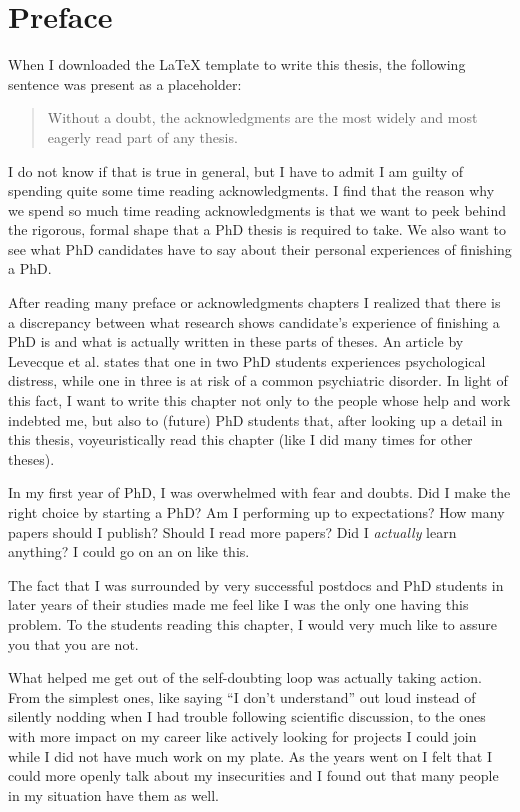 \chapter*{Preface}

When I downloaded the \LaTeX{} template to write this thesis, the following
sentence was present as a placeholder:
\begin{quote}
    Without a doubt, the acknowledgments are the most widely and most eagerly
    read part of any thesis.
\end{quote}
\noindent
I do not know if that is true in general, but I have to admit I am guilty of
spending quite some time reading acknowledgments. I find that the reason why we
spend so much time reading acknowledgments is that we want to peek behind the
rigorous, formal shape that a PhD thesis is required to take. We also want to
see what PhD candidates have to say about their personal experiences of
finishing a PhD.

After reading many preface or acknowledgments chapters I realized that there
is a discrepancy between what research shows candidate's experience of finishing
a PhD is and what is actually written in these parts of theses. An
article by Levecque et al. \cite{labhg-17-phdstudents} states that one in two
PhD students experiences psychological distress, while one in three is at risk
of a common psychiatric disorder. In light of this fact, I want to write
this chapter not only to the people whose help and work indebted me, but also to
(future) PhD students that, after looking up a detail in this thesis,
voyeuristically read this chapter (like I did many times for other theses).

In my first year of PhD, I was overwhelmed with fear and doubts. Did I make the
right choice by starting a PhD? Am I performing up to expectations? How many
papers should I publish? Should I read more papers? Did I \emph{actually} learn
anything? I could go on an on like this.

The fact that I was surrounded by very successful postdocs and PhD students in
later years of their studies made me feel like I was the only one having this
problem. To the students reading this chapter, I would very much like to assure
you that you are not. 

What helped me get out of the self-doubting loop was actually taking action. From
the simplest ones, like saying ``I don't understand'' out loud instead of
silently nodding when I had trouble following scientific discussion, to the
ones with more impact on my career like actively looking for projects I could
join while I did not have much work on my plate. As the years went on I felt
that I could more openly talk about my insecurities and I found out that many
people in my situation have them as well.

